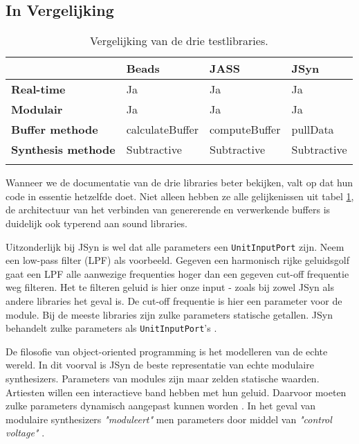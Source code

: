 \subsection*{In Vergelijking}

\begin{longtable}[c]{l|lll}
         & \textbf{Beads} & \textbf{JASS} & \textbf{JSyn} \\ \hline
        \textbf{Real-time} & Ja & Ja & Ja \\
        \textbf{Modulair} & Ja & Ja & Ja \\
        \textbf{Buffer methode} & calculateBuffer & computeBuffer & pullData \\
        \textbf{Synthesis methode} & Subtractive & Subtractive & Subtractive \\
    \caption{Vergelijking van de drie testlibraries.}
    \label{tab:vergelijking}
\end{longtable}

Wanneer we de documentatie van de drie libraries beter bekijken, valt op dat hun code in essentie hetzelfde doet. Niet alleen hebben ze alle gelijkenissen uit tabel \ref{tab:vergelijking}, de architectuur van het verbinden van genererende en verwerkende buffers is duidelijk ook typerend aan sound libraries.

Uitzonderlijk bij JSyn is wel dat alle parameters een \verb+UnitInputPort+ zijn. Neem een low-pass filter (LPF) als voorbeeld. Gegeven een harmonisch rijke geluidsgolf gaat een LPF alle aanwezige frequenties hoger dan een gegeven cut-off frequentie weg filteren. Het te filteren geluid is hier onze input - zoals bij zowel JSyn als andere libraries het geval is. De cut-off frequentie is hier een parameter voor de module.\newline
Bij de meeste libraries zijn zulke parameters statische getallen. JSyn behandelt zulke parameters als \verb+UnitInputPort+'s \autocite{jsyndocs}.

De filosofie van object-oriented programming is het modelleren van de echte wereld. In dit voorval is JSyn de beste representatie van echte modulaire synthesizers. Parameters van modules zijn maar zelden statische waarden. Artiesten willen een interactieve band hebben met hun geluid. Daarvoor moeten zulke parameters dynamisch aangepast kunnen worden \autocite{vagabundos}. In het geval van modulaire synthesizers \textit{"moduleert"} men parameters door middel van \textit{"control voltage"} \autocite{modular}.

\iffalse

